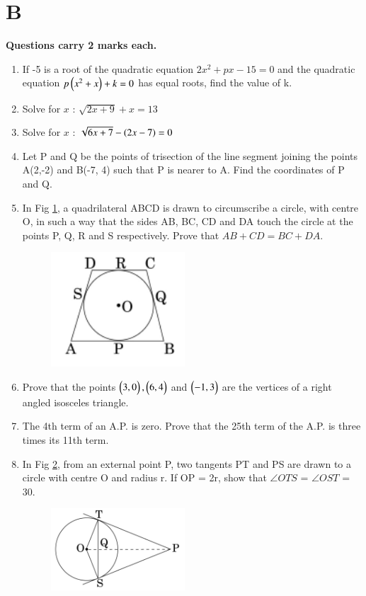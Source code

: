 \documentclass[book,11pt,onecolumn]{IEEEtran}
\renewcommand\thesection{\arabic{section}}
\begin{document}
\section{\textbf{B}}
\textbf{Questions carry 2 marks each.}
\begin{enumerate}[label=\thesection.\arabic*.,ref=\thesection.\theenumi]
\item If -5 is a root of the quadratic equation $2x^2+px-15=0$ and the quadratic equation $p\left(x^2+x\right)+k=0 $ has equal roots, find the value of k. \\
\item Solve for $x$ : $\sqrt{2x+9} + x = 13$ \\
\item Solve for $x$ : $\sqrt{6x+7}-\left(2x-7\right)= 0$ \\
\item  Let P and Q be the points of trisection of the line segment joining the points A(2,-2) and B(-7, 4) such that P is nearer to A. Find the coordinates of P and Q.\\
\item  In Fig \ref{figure_2}, a quadrilateral ABCD is drawn to circumscribe a circle, with centre O, in such a way that the sides AB, BC, CD and DA touch the circle at the points P, Q, R and S respectively. Prove that $ AB + CD= BC + DA $.\\
	\begin{figure}[H]
\centering
      \includegraphics[width=5cm]{figs/2.png}
      \caption{}
      \label{figure_2}
\end{figure} 
\item  Prove that the points $\begin{pmatrix}3,0\end{pmatrix}, \begin{pmatrix}6, 4\end{pmatrix}$ and $\begin{pmatrix}-1, 3\end{pmatrix}$ are the vertices of a right angled isosceles triangle.\\
\item  The 4th term of an A.P. is zero. Prove that the 25th term of the A.P. is three times its 11th term.\\
\item  In Fig \ref{figure_3}, from an external point P, two tangents PT and PS are drawn to a circle with centre O and radius r. If OP = 2r, show that $\angle OTS $ = $\angle OST $ = 30\degree.
\begin{figure}[H]
\centering
\includegraphics[width=5cm]{figs/3.png}
\caption{}
      \label{figure_3}
   \end{figure} 
   \end{enumerate}
\end{document}
